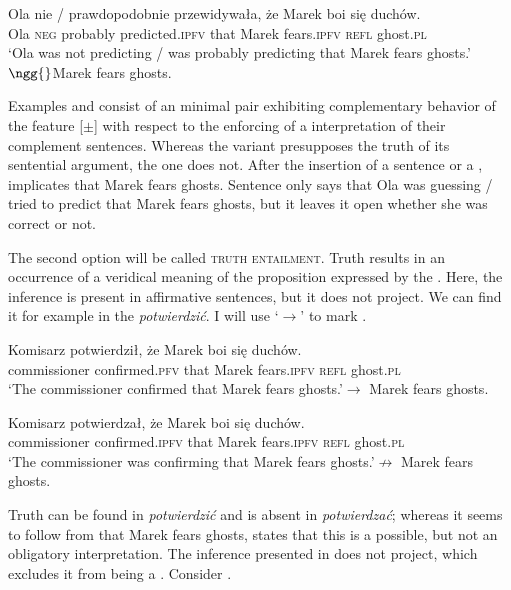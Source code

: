 \documentclass[output=paper,  modfonts,  newtxmath,  hidelinks		  ]{langscibook}
\begin{document}
\ea\label{21:2}
\gll Ola nie / prawdopodobnie przewidywała, że Marek boi się duchów.\\  
    Ola \textsc{neg} {} probably predicted.\textsc{ipfv} that Marek fears.\textsc{ipfv} \textsc{refl} ghost.\textsc{pl}\\
\glt	 `Ola was not predicting / was probably predicting that Marek fears ghosts.'\newline${}\ngg{}$Marek fears ghosts.
\z

\noindent Examples  and  consist of an  minimal pair exhibiting complementary behavior of the feature [$\pm$] with respect to the enforcing of a  interpretation of their complement sentences. Whereas the  variant presupposes the truth of its sentential argument, the  one does not. After the insertion of a sentence  or a ,  implicates that Marek fears ghosts. Sentence  only says that Ola was guessing / tried to predict that Marek fears ghosts, but it leaves it open whether she was correct or not.

The second option will be called \textsc{truth entailment}. Truth  results in an occurrence of a veridical meaning of the proposition expressed by the . Here, the inference is present in affirmative sentences, but it does not project. We can find it for example in the  \textit{potwierdzić}. I will use ‘$\rightarrow$’ to mark .

\ea\label{21:3}
\gll Komisarz potwierdził, że Marek boi się duchów.\\
    commissioner confirmed.\textsc{pfv} that Marek fears.\textsc{ipfv} \textsc{refl} ghost.\textsc{pl}\\
\glt	`The commissioner confirmed that Marek fears ghosts.'\newline$\rightarrow$ Marek fears ghosts.
\z

\ea\label{21:4}
\gll Komisarz potwierdzał, że Marek boi się duchów.\\  
   	commissioner confirmed.\textsc{ipfv} that Marek fears.\textsc{ipfv} \textsc{refl} ghost.\textsc{pl}\\
\glt	`The commissioner was confirming that Marek fears ghosts.'\newline$\nrightarrow$  Marek fears ghosts.
\z

\noindent Truth  can be found in \textit{potwierdzić} and is absent in \textit{potwierdzać}; where\-as it seems to follow from  that Marek fears ghosts,  states that this is a possible, but not an obligatory interpretation. The inference presented in  does not project, which excludes it from being a . Consider .
\end{document}
